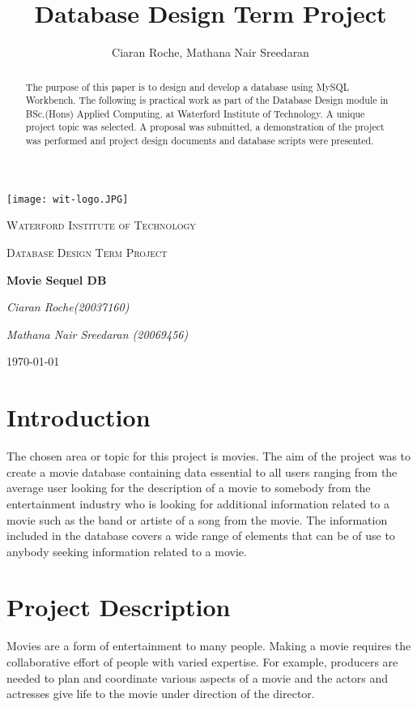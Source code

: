 \documentclass[12pt]{article}
\title{Database Design Term Project}
\author{Ciaran Roche, Mathana Nair Sreedaran}
\begin{document}
\begin{titlepage}
    \centering
    \texttt{[image: wit-logo.JPG]}\par\vspace{1cm}
    {\scshape\LARGE Waterford Institute of Technology \par}
    \vspace{1cm}
    {\scshape\Large Database Design Term Project\par}
    \vspace{1.5cm}
    {\huge\bfseries Movie Sequel DB\par}
    \vspace{2cm}
    {\Large\itshape Ciaran Roche(20037160)\par}
    {\Large\itshape Mathana Nair Sreedaran (20069456)\par}
    \vfill
    {\large \today\par}
\end{titlepage}
\newpage
{}
\tableofcontents

\newpage
{}

\begin{abstract}
    The purpose of this paper is to design and develop a database using MySQL Workbench. The following is practical work as part of the Database Design module in BSc.(Hons) Applied Computing, at Waterford Institute of Technology. A unique project topic was selected. A proposal was submitted, a demonstration of the project was performed and project design documents and database scripts were presented.
\end{abstract}

\section{Introduction}
The chosen area or topic for this project is movies. The aim of the project was to create a movie database containing data essential to all users ranging from the average user looking for the description of a movie to somebody from the entertainment industry who is looking for additional information related to a movie such as the band or artiste of a song from the movie. The information included in the database covers a wide range of elements that can be of use to anybody seeking information related to a movie. 
    
\section{Project Description}
Movies are a form of entertainment to many people. Making a movie requires the collaborative effort of people with varied expertise. For example, producers are needed to plan and coordinate various aspects of a movie and the actors and actresses give life to the movie under direction of the director.
\end{document}
